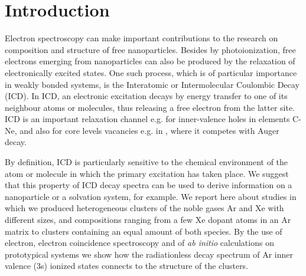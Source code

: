 \section{Introduction}
%
Electron spectroscopy can make important contributions to the research on composition and structure of free nanoparticles.\cite{jpcc} Besides by photoionization, free electrons emerging from nanoparticles can also be produced by the relaxation of electronically excited states. One such process, which is of particular importance in weakly bonded systems, is the Interatomic or Intermolecular Coulombic Decay (ICD).\cite{cederbaum} In ICD, an electronic excitation decays by energy transfer to one of its neighbour atoms or molecules, thus releasing a free electron from the latter site. ICD is an important relaxation channel e.g. for inner-valence holes in elements C-Ne, and also for core levels vacancies e.g. in , where it competes with Auger decay\cite{slavicek}. 

By definition, ICD is particularly sensitive to the chemical environment of the atom or molecule in which the primary excitation has taken place. We suggest that this property of ICD decay spectra can be used to derive information on a nanoparticle or a solvation system, for example. We report here about studies in which we produced heterogeneous clusters of the noble gases Ar and Xe with different sizes, and compositions ranging from a few Xe dopant atoms in an Ar matrix to clusters containing an equal amount of both species. By the use of electron, electron coincidence spectroscopy and of {\it ab initio} calculations on prototypical systems we show how the radiationless decay spectrum of Ar inner valence (3s) ionized states connects to the structure of the clusters.

